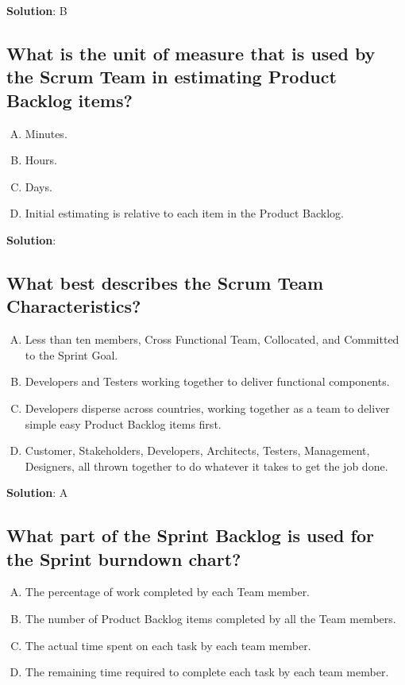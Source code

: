 \textbf{Solution}: B


\subsection{What is the unit of measure that is used by the Scrum Team in estimating Product Backlog items?}
\begin{enumerate}[A)]
  \item Minutes.
  \item Hours.
  \item Days.
  \item Initial estimating is relative to each item in the Product Backlog.
\end{enumerate}


\textbf{Solution}:


\subsection{What best describes the Scrum Team Characteristics?}
\begin{enumerate}[A)]
  \item Less than ten members, Cross Functional Team, Collocated, and Committed to the Sprint Goal.
  \item Developers and Testers working together to deliver functional components.
  \item Developers disperse across countries, working together as a team to deliver simple easy Product Backlog items first.
  \item Customer, Stakeholders, Developers, Architects, Testers, Management, Designers, all thrown together to do whatever it takes to get the job done.
\end{enumerate}


\textbf{Solution}: A


\subsection{What part of the Sprint Backlog is used for the Sprint burndown chart?}
\begin{enumerate}[A)]
  \item The percentage of work completed by each Team member.
  \item The number of Product Backlog items completed by all the Team members.
  \item The actual time spent on each task by each team member.
  \item The remaining time required to complete each task by each team member.
\end{enumerate}


